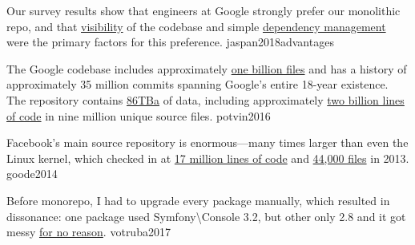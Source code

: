 \documentclass{article}
\begin{document}

  {Our survey results show that engineers at Google strongly prefer our monolithic repo, and that \ul{visibility} of the codebase and simple \ul{dependency management} were the primary factors for this preference.}
  {jaspan2018advantages}


  {The Google codebase includes approximately \ul{one billion files} and has a history of approximately 35 million commits spanning Google's entire 18-year existence. The repository contains \ul{86TBa} of data, including approximately \ul{two billion lines of code} in nine million unique source files.}
  {potvin2016}

  {Facebook's main source repository is enormous---many times larger than even the Linux kernel, which checked in at \ul{17 million lines of code} and \ul{44,000 files} in 2013.}
  {goode2014}

  {Before monorepo, I had to upgrade every package manually, which resulted in dissonance: one package used Symfony\textbackslash{}Console 3.2, but other only 2.8 and it got messy \ul{for no reason}.}
  {votruba2017}
\end{document}
